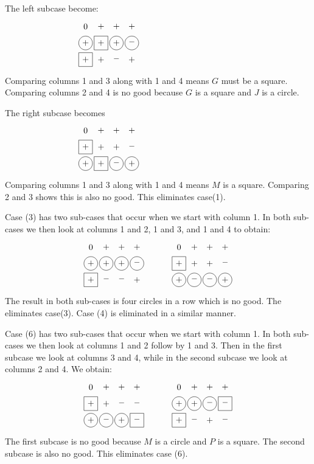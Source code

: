 The left subcase become:
\begin{equation*}
\myarrset
\begin{array}{cccc}
\ndcz & \ndcp & \ndcp & \ndcp \\
\dcp  & \dsp  & \dcp  & \dcm  \\
\dsp  & \ndcp & \ndcm & \ndcp 
\end{array}
~~~~~~~~~~~~~~~~~~~~~~~~~~~~~~~~~~~
\end{equation*}
Comparing columns 1 and 3 along with 1 and 4 means $G$ must be a square.
Comparing columns 2 and 4 is no good because $G$ is a square and $J$ is a
circle.

The right subcase becomes
\begin{equation*}
\myarrset
\begin{array}{cccc}
\ndcz & \ndcp & \ndcp & \ndcp \\
\dsp  & \ndcp & \ndcp & \ndcm \\
\dcp  & \dsp  & \dcm  & \dcp 
\end{array}
~~~~~~~~~~~~~~~~~~~~~~~~~~~~~~~~~~~
\end{equation*}
Comparing columns 1 and 3 along with 1 and 4 means $M$ is a square.  Comparing
2 and 3 shows this is also no good.  This eliminates case(1).

Case (3) has two sub-cases that occur when we start with column 1.
In both sub-cases we then look at columns 1 and 2, 1 and 3, and 1 and 4 to
obtain:
\begin{equation*}
\myarrset
\begin{array}{ccccccccc}
\ndcz & \ndcp & \ndcp & \ndcp & ~~~~~~~~~ & \ndcz & \ndcp & \ndcp & \ndcp \\
\dcp  & \dcp  & \dcp  & \dcm  & ~~~~~~~~~ & \dsp  & \ndcp & \ndcp & \ndcm \\
\dsp  & \ndcm & \ndcm & \ndcp & ~~~~~~~~~ & \dcp  & \dcm  & \dcm  & \dcp
\end{array}
\end{equation*}
The result in both sub-cases is four circles in a row which is no good.  The
eliminates case(3).  Case (4) is eliminated in a similar manner.

Case (6) has two sub-cases that occur when we start with column 1.
In both sub-cases we then look at columns 1 and 2 follow by 1 and 3.
Then in the first subcase we look at columns 3 and 4, while in the second
subcase we look at columns 2 and 4.  We obtain:
\begin{equation*}
\myarrset
\begin{array}{ccccccccc}
\ndcz & \ndcp & \ndcp & \ndcp & ~~~~~~~~~ & \ndcz & \ndcp & \ndcp & \ndcp \\
\dsp  & \ndcp & \ndcm & \ndcm & ~~~~~~~~~ & \dcp  & \dcp  & \dcm  & \dsm  \\
\dcp  & \dcm  & \dcp  & \dsm  & ~~~~~~~~~ & \dsp  & \ndcm & \ndcp & \ndcm
\end{array}
\end{equation*}
The first subcase is no good because $M$ is a circle and $P$ is a square.
The second subcase is also no good.  This eliminates case (6).

